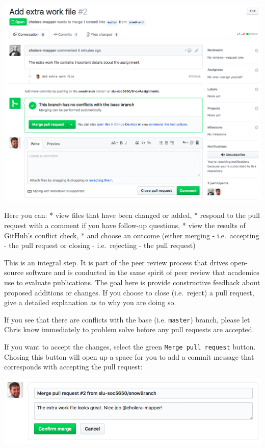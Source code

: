 \documentclass[]{book}
\theoremstyle{definition}
\theoremstyle{definition}
\theoremstyle{definition}
\theoremstyle{remark}
\begin{document}
\includegraphics[width=1\linewidth]{images/branch7}

Here you can: * view files that have been changed or added, * respond to
the pull request with a comment if you have follow-up questions, * view
the results of GitHub's conflict check, * and choose an outcome (either
merging - i.e.~accepting - the pull request or closing - i.e.~rejecting
- the pull request)

This is an integral step. It is part of the peer review process that
drives open-source software and is conducted in the same spirit of peer
review that academics use to evaluate publications. The goal here is
provide constructive feedback about proposed additions or changes. If
you choose to close (i.e.~reject) a pull request, give a detailed
explanation as to why you are doing so.

If you see that there are conflicts with the base (i.e. \texttt{master})
branch, please let Chris know immediately to problem solve before any
pull requests are accepted.

If you want to accept the changes, select the green
\texttt{Merge\ pull\ request} button. Chosing this button will open up a
space for you to add a commit message that corresponds with accepting
the pull request:

\includegraphics[width=1\linewidth]{images/branch8}
\end{document}
